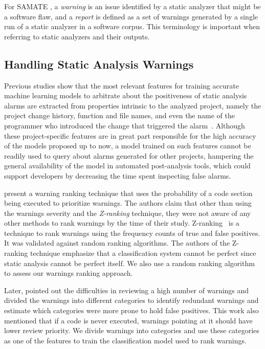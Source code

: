 For SAMATE \citep{black_counting_2011}, a \textit{warning} is an issue identified
by a static analyzer that might be a software flaw, and a \textit{report} is
defined as a set of warnings generated by a single run of a static analyzer in
a software corpus. This terminology is important when referring to static
analyzers and their outputs.

\subsection{Handling Static Analysis Warnings}
\label{sub:related_work}

Previous studies show that the most relevant features for training accurate
machine learning models to arbitrate about the positiveness of static analysis
alarms are extracted from properties intrinsic to the analyzed project,
namely the project change history, function and file names, and even the name
of the programmer who introduced the change that triggered the
alarm~\citep{kremenek2004correlation, heckman2009model, jung2005taming,
ruthruff_predicting_2008, yoon2014reducing}. Although these project-specific
features are in great part responsible for the high accuracy of the models
proposed up to now, a model trained on such features cannot be readily used to
query about alarms generated for other projects, hampering the general
availability of the model in automated post-analysis tools, which could
support developers by decreasing the time spent inspecting false alarms.

\cite{boogerd2006prioritizing} present a warning ranking technique
that uses the probability of a code section being executed to prioritize
warnings. The authors claim that other than using the warnings severity and the
\textit{Z-ranking} technique, they were not aware of any other methods to rank
warnings by the time of their study. Z-ranking~\citep{kremenek2003z} is a
technique to rank warnings using the frequency counts of true and false
positives. It was validated against random ranking algorithms. The
authors of the Z-ranking technique emphasize that a classification system
cannot be perfect since static analysis cannot be perfect itself.
We also use a random ranking algorithm to assess our warnings ranking approach.

Later, \cite{muske2013review} pointed out the difficulties in reviewing a high
number of warnings and divided the warnings into different categories to identify
redundant warnings and estimate which categories were more prone to hold false
positives. This work also mentioned that if a code is never executed,
warnings pointing at it should have lower review priority.
We divide warnings into categories and use these categories as one of the features
to train the classification model used to rank warnings.

